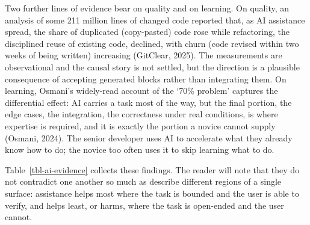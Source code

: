 \documentclass[
  letterpaper,
  11pt]{scrbook}
\begin{document}
Two further lines of evidence bear on quality and on learning. On
quality, an analysis of some 211 million lines of changed code reported
that, as AI assistance spread, the share of duplicated (copy-pasted)
code rose while refactoring, the disciplined reuse of existing code,
declined, with churn (code revised within two weeks of being written)
increasing (GitClear, 2025). The measurements are observational and the
causal story is not settled, but the direction is a plausible
consequence of accepting generated blocks rather than integrating them.
On learning, Osmani's widely-read account of the `70\% problem' captures
the differential effect: AI carries a task most of the way, but the
final portion, the edge cases, the integration, the correctness under
real conditions, is where expertise is required, and it is exactly the
portion a novice cannot supply (Osmani, 2024). The senior developer uses
AI to accelerate what they already know how to do; the novice too often
uses it to skip learning what to do.

Table~\ref{tbl-ai-evidence} collects these findings. The reader will
note that they do not contradict one another so much as describe
different regions of a single surface: assistance helps most where the
task is bounded and the user is able to verify, and helps least, or
harms, where the task is open-ended and the user cannot.
\end{document}
